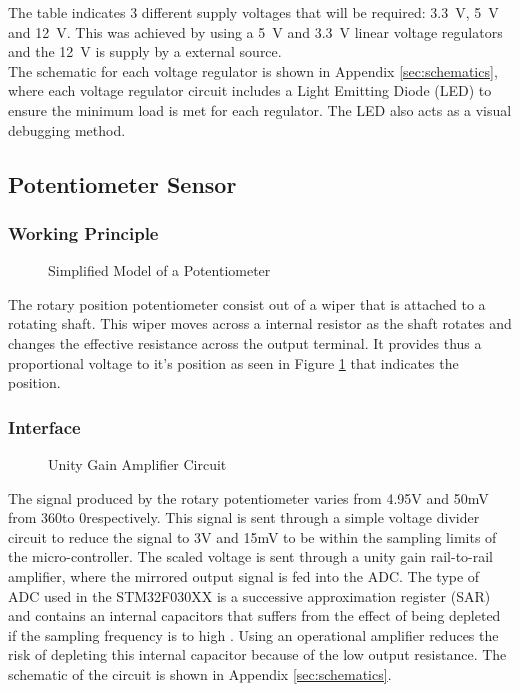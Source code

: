 The table indicates 3 different supply voltages that will be required: \SI{3.3}{V}, \SI{5}{V} and \SI{12}{V}. This was achieved by using a \SI{5}{V} and \SI{3.3}{V} linear voltage regulators and the \SI{12}{V} is supply by a external source.\\

The schematic for each voltage regulator is shown in Appendix \ref{sec:schematics}, where each voltage regulator circuit includes a Light Emitting Diode (LED) to ensure the minimum load is met for each regulator. The LED also acts as a visual debugging method.

\subsection{Potentiometer Sensor}
\subsubsection{Working Principle}
\begin{figure}[h]
	\centering
	
	\caption{Simplified Model of a Potentiometer}
	\label{fig:potentiometer}
\end{figure}
The rotary position potentiometer consist out of a wiper that is attached to a rotating shaft. This wiper moves across a internal resistor as the shaft rotates and changes the effective resistance across the output terminal. It provides thus a proportional voltage to it's position as seen in Figure \ref{fig:potentiometer} that indicates the position.

\subsubsection{Interface}
\begin{figure}[h]
	\centering
	
	\caption{Unity Gain Amplifier Circuit}
	\label{fig:unitygain}
\end{figure}
The signal produced by the rotary potentiometer varies from 4.95V and 50mV from 360\textdegree \space to 0\textdegree \space respectively. This signal is sent through a simple voltage divider circuit to reduce the signal to 3V and 15mV to be within the sampling limits of the micro-controller. The scaled voltage is sent through a unity gain rail-to-rail amplifier, where the mirrored output signal is fed into the ADC. The type of ADC used in the STM32F030XX is a successive approximation register (SAR) and contains an internal capacitors that suffers from the effect of being depleted if the sampling frequency is to high \citep{stm32_ADC:2017}. Using an operational amplifier reduces the risk of depleting this internal capacitor because of the low output resistance. The schematic of the circuit is shown in Appendix \ref{sec:schematics}.\\


